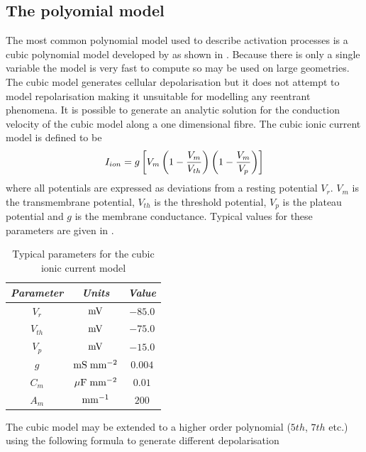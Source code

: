 \subsection{The polyomial model}
\label{sec:The_polynomial_model}
The most common polynomial model used to describe activation processes is a
cubic polynomial model developed by  as shown in
. Because there is only a single
variable the model is very fast to compute so may be used on large geometries.
The cubic model generates cellular depolarisation but it does not attempt to
model repolarisation making it unsuitable for modelling any reentrant
phenomena. It is possible to generate an analytic solution for the conduction
velocity of the cubic model along a one dimensional fibre. The cubic ionic current
model is defined to be
\begin{equation}
  I_{ion} = g \left[  V_m \left(  1 - \dfrac{V_m}{V_{th}} \right)
  \left(  1 - \dfrac{V_m}{V_p} \right) \right]
  \label{eqn:cubic_ionic_current_model}
\end{equation}
where all potentials are expressed as deviations from a resting potential
$V_r$. $V_m$ is the transmembrane potential, $V_{th}$ is the threshold
potential, $V_p$ is the plateau potential and $g$ is the membrane conductance.
Typical values for these parameters are given in .
\begin{table}[hbtp] \centering
  \begin{tabular}{|c|c|c|}
    \hline
    \emph{Parameter} & \emph{Units} & \emph{Value} \\ 
    \hline
    \hline 
    $V_r$ & $\mathrm{mV}$ & $-85.0$ \\
    $V_{th}$ & $\mathrm{mV}$ & $-75.0$ \\
    $V_p$ & $\mathrm{mV}$ & $-15.0$ \\
    $g$ & ${\mathrm{mS}\thickspace\mathrm{mm}^{-2}}$ & $0.004$ \\
    $C_m$ & $\mathrm{\mu F}\thickspace\mathrm{mm}^{-2}$ & $0.01$ \\
    $A_m$ & $\mathrm{mm}^{-1}$ & $200$ \\
    \hline
  \end{tabular}
  \caption[Typical parameters for the cubic ionic current model]{Typical
    parameters for the cubic ionic current model}
  \label{tab:Cubic_Model_Params}
\end{table}
The cubic model may be extended to a higher order polynomial ($5th$, $7th$
etc.) using the following formula to generate different depolarisation
